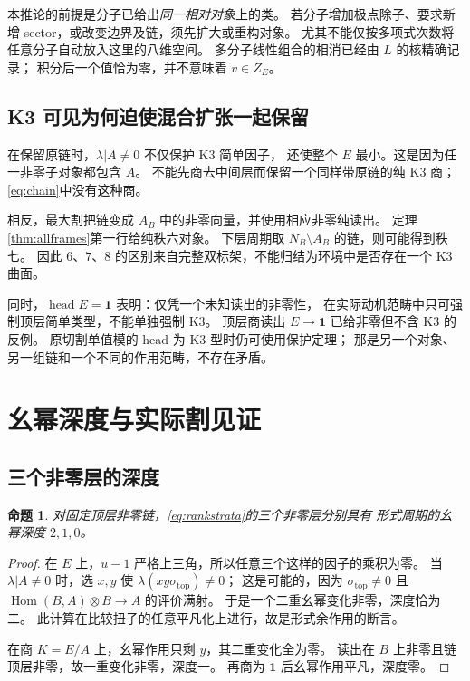 \documentclass[11pt,a4paper]{ctexart}
\theoremstyle{cnplain}
\newtheorem{proposition}[theorem]{命题}
\theoremstyle{definition}
\theoremstyle{remark}
\newcommand{\Hom}{\operatorname{Hom}}
\newcommand{\head}{\operatorname{head}}
\begin{document}
本推论的前提是分子已给出\emph{同一相对对象}上的类。
若分子增加极点除子、要求新增 sector，或改变边界及链，须先扩大或重构对象。
尤其不能仅按多项式次数将任意分子自动放入这里的八维空间。
多分子线性组合的相消已经由 $L$ 的核精确记录；
积分后一个值恰为零，并不意味着 $v\in Z_E$。

\subsection{K3 可见为何迫使混合扩张一起保留}
在保留原链时，$\lambda|A\ne0$ 不仅保护 K3 简单因子，
还使整个 $E$ 最小。这是因为任一非零子对象都包含 $A$。
不能先商去中间层而保留一个同样带原链的纯 K3 商；
\eqref{eq:chain}中没有这种商。

相反，最大割把链变成 $A_B$ 中的非零向量，并使用相应非零纯读出。
定理\ref{thm:allframes}第一行给纯秩六对象。
下层周期取 $N_B\setminus A_B$ 的链，则可能得到秩七。
因此 $6$、$7$、$8$ 的区别来自完整双标架，不能归结为环境中是否存在一个 K3 曲面。

同时，$\head E=\mathbf1$ 表明：仅凭一个未知读出的非零性，
在实际动机范畴中只可强制顶层简单类型，不能单独强制 K3。
顶层商读出 $E\to\mathbf1$ 已给非零但不含 K3 的反例。
原切割单值模的 head 为 K3 型时仍可使用保护定理；
那是另一个对象、另一组链和一个不同的作用范畴，不存在矛盾。

\section{幺幂深度与实际割见证}
\subsection{三个非零层的深度}
\begin{proposition}\label{prop:depth}
对固定顶层非零链，\eqref{eq:rankstrata}的三个非零层分别具有
形式周期的幺幂深度 $2,1,0$。
\end{proposition}
\begin{proof}
在 $E$ 上，$u-1$ 严格上三角，所以任意三个这样的因子的乘积为零。
当 $\lambda|A\ne0$ 时，选 $x,y$ 使 $\lambda(xy\sigma_{\mathrm{top}})\ne0$；
这是可能的，因为 $\sigma_{\mathrm{top}}\ne0$ 且
$\Hom(B,A)\otimes B\to A$ 的评价满射。
于是一个二重幺幂变化非零，深度恰为二。
此计算在比较扭子的任意平凡化上进行，故是形式余作用的断言。

在商 $K=E/A$ 上，幺幂作用只剩 $y$，其二重变化全为零。
读出在 $B$ 上非零且链顶层非零，故一重变化非零，深度一。
再商为 $\mathbf1$ 后幺幂作用平凡，深度零。
\end{proof}
\end{document}
